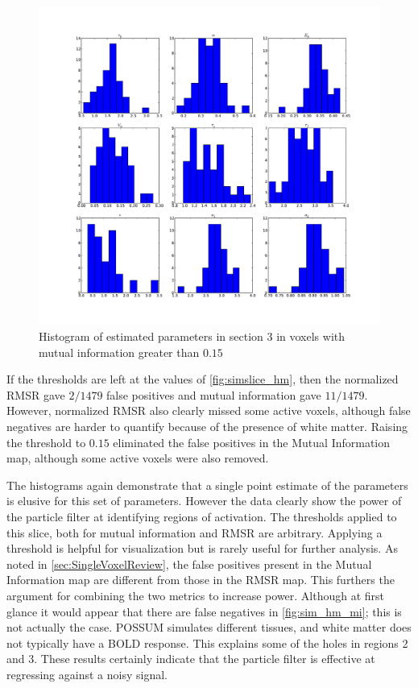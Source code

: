 \begin{figure} %
\centering
\includegraphics[clip=true,trim=2.5cm 2cm 2cm 1cm,width=15cm]{images/slicesim_hist3}
\caption{Histogram of estimated parameters in section 3 in voxels with mutual information greater
than $0.15$}
\label{fig:slicesim_hist3}
\end{figure}

If the thresholds are left at the values of \autoref{fig:simslice_hm}, then
the normalized \ac{RMSR} gave $2/1479$  false positives and mutual information gave
$11/1479$. However, normalized \ac{RMSR} also clearly missed some active voxels, although
false negatives are harder to quantify because of the presence of white matter.
Raising the threshold to $0.15$ eliminated the false positives in the
Mutual Information map, although some active voxels were also removed.

The histograms again demonstrate that a single point estimate of the parameters
is elusive for this set of parameters. However the data clearly show the power
of the particle filter at identifying regions of activation.
The thresholds applied to this slice, both for mutual information and
\acs{RMSR} are arbitrary. Applying a
threshold is helpful for visualization but is rarely useful for further analysis.
As noted in \autoref{sec:SingleVoxelReview},
the false positives present in the Mutual Information
map are different from those in the \ac{RMSR} map. This furthers the argument
for combining the two metrics to increase power. Although
at first glance it would appear that there are false negatives in
\autoref{fig:sim_hm_mi}; this is
not actually the case. POSSUM simulates different tissues, and white matter
does not typically  have a \ac{BOLD} response. This explains some of the 
holes in regions
2 and 3. These results certainly indicate that the particle filter is effective
at regressing against a noisy signal.
